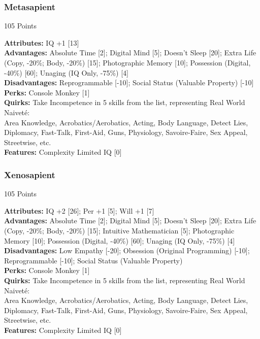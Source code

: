 \begin{multicols*}{3}
	\subsubsection*{Metasapient}
	\begin{flushright}
		105 Points
	\end{flushright}
	\textbf{Attributes:} 
	IQ +1 [13]
	\\\textbf{Advantages:} 
	Absolute Time [2]; Digital Mind [5]; Doesn't Sleep [20]; Extra Life (Copy, -20\%; Body, -20\%) [15]; Photographic Memory [10]; Possession (Digital, -40\%) [60]; Unaging (IQ Only, -75\%) [4]
	\\\textbf{Disadvantages:} 
	Reprogrammable [-10]; Social Status (Valuable Property) [-10]
	\\\textbf{Perks:}
	Console Monkey [1]
	\\\textbf{Quirks:}
	Take Incompetence in 5 skills from the list, representing Real World Naiveté:\\
	Area Knowledge, Acrobatics/Aerobatics, Acting, Body Language, Detect Lies, Diplomacy, Fast-Talk, First-Aid, Guns, Physiology,  Savoire-Faire, Sex Appeal, Streetwise, etc.
	\\\textbf{Features:}
	Complexity Limited IQ [0]
	
	\subsubsection*{Xenosapient}
	\begin{flushright}
		105 Points
	\end{flushright}
	\textbf{Attributes:} 
	IQ +2 [26]; Per +1 [5]; Will +1 [7]
	\\\textbf{Advantages:} 
	Absolute Time [2]; Digital Mind [5]; Doesn't Sleep [20]; Extra Life (Copy, -20\%; Body, -20\%) [15]; Intuitive Mathematician [5]; Photographic Memory [10]; Possession (Digital, -40\%) [60]; Unaging (IQ Only, -75\%) [4]
	\\\textbf{Disadvantages:} 
	Low Empathy [-20]; Obsession (Original Programming) [-10]; Reprogrammable [-10]; Social Status (Valuable Property) 
	\\\textbf{Perks:}
	Console Monkey [1]
	\\\textbf{Quirks:}
	Take Incompetence in 5 skills from the list, representing Real World Naiveté:\\
	Area Knowledge, Acrobatics/Aerobatics, Acting, Body Language, Detect Lies, Diplomacy, Fast-Talk, First-Aid, Guns, Physiology,  Savoire-Faire, Sex Appeal, Streetwise, etc.
	\\\textbf{Features:}
	Complexity Limited IQ [0]
	

\end{multicols*}

